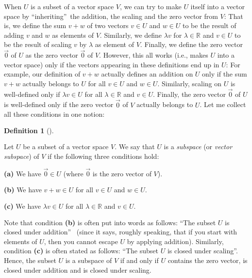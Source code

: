 \documentclass[numbers=enddot,12pt,final,onecolumn,notitlepage]{scrartcl}%
\theoremstyle{definition}
\newtheorem{defi}[theo]{Definition}
\newenvironment{definition}[1][]
{\begin{defi}[#1]\begin{leftbar}}
{\end{leftbar}\end{defi}}
\begin{document}
When $U$ is a subset of a vector space $V$, we can try to make $U$ itself into
a vector space by \textquotedblleft inheriting\textquotedblright\ the
addition, the scaling and the zero vector from $V$: That is, we define the sum
$v+w$ of two vectors $v\in U$ and $w\in U$ to be the result of adding $v$ and
$w$ as elements of $V$. Similarly, we define $\lambda v$ for $\lambda
\in\mathbb{R}$ and $v\in U$ to be the result of scaling $v$ by $\lambda$ as
element of $V$. Finally, we define the zero vector $\overrightarrow{0}$ of $U$
as the zero vector $\overrightarrow{0}$ of $V$. However, this all works (i.e.,
makes $U$ into a vector space) only if the vectors appearing in these
definitions end up in $U$: For example, our definition of $v+w$ actually
defines an addition on $U$ only if the sum $v+w$ actually belongs to $U$ for
all $v\in U$ and $w\in U$. Similarly, scaling on $U$ is well-defined only if
$\lambda v\in U$ for all $\lambda\in\mathbb{R}$ and $v\in U$. Finally, the
zero vector $\overrightarrow{0}$ of $U$ is well-defined only if the zero
vector $\overrightarrow{0}$ of $V$ actually belongs to $U$. Let me collect all
these conditions in one notion:

\begin{definition}
\label{def.subspace}Let $U$ be a subset of a vector space $V$. We say that $U$
is a \textit{subspace} (or \textit{vector subspace}) of $V$ if the following
three conditions hold:

\textbf{(a)} We have $\overrightarrow{0}\in U$ (where $\overrightarrow{0}$ is
the zero vector of $V$).

\textbf{(b)} We have $v+w\in U$ for all $v\in U$ and $w\in U$.

\textbf{(c)} We have $\lambda v\in U$ for all $\lambda\in\mathbb{R}$ and $v\in
U$.

Note that condition \textbf{(b)} is often put into words as follows:
\textquotedblleft The subset $U$ is closed under addition\textquotedblright%
\ (since it says, roughly speaking, that if you start with elements of $U$,
then you cannot escape $U$ by applying addition). Similarly, condition
\textbf{(c)} is often stated as follows: \textquotedblleft The subset $U$ is
closed under scaling\textquotedblright. Hence, the subset $U$ is a subspace of
$V$ if and only if $U$ contains the zero vector, is closed under addition and
is closed under scaling.
\end{definition}
\end{document}
